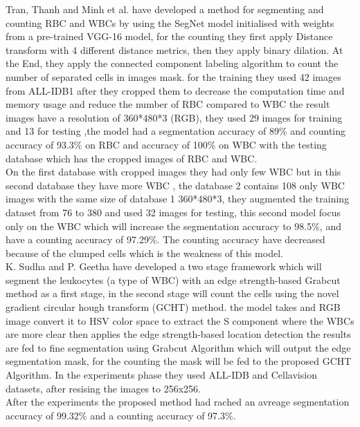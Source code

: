 Tran, Thanh and Minh et al. \textsuperscript{\cite{tran2019blood}} have developed a method for segmenting and counting RBC and WBCs by using the SegNet model initialised with weights from a pre-trained VGG-16 model, for the counting they first apply Distance transform with 4 different distance metrics, then they apply binary dilation. At the End, they apply the connected component labeling algorithm to count the number of separated cells in images mask. for the training they used 42 images from ALL-IDB1 \textsuperscript{\cite{labati2011all}} after they cropped them to decrease the computation time and
memory usage and reduce the number of RBC compared to WBC the result images have a resolution of 360*480*3 (RGB), they used 29 images for training and 13 for testing ,the model had a segmentation accuracy of 89\% and counting accuracy of 93.3\% on RBC and accuracy of 100\% on WBC with the testing database which has the cropped images of RBC and WBC.\\
On the first database with cropped images they had only few WBC but in this second database they have more WBC , the database 2 contains 108 only WBC images with the same size of database 1 360*480*3, they augmented the training dataset from 76 to 380 and used 32 images for testing, this second model focus only on the WBC which will increase the segmentation accuracy to 98.5\%, and have a counting accuracy of 97.29\%. The counting accuracy have decreased because of the clumped cells which is the weakness of this model.\\

K. Sudha and P. Geetha \textsuperscript{\cite{SUDHA2020639}} have developed a two stage framework which will segment the leukocytes (a type of WBC) with an edge strength-based Grabcut method as a first stage, in the second stage will count the cells using the novel gradient circular hough transform (GCHT) method. the model takes and RGB image convert it to HSV color space to extract the S component where the WBCs are more clear then applies the edge strength-based location detection the results are fed to fine segmentation using Grabcut Algorithm which will output the edge segmentation mask, for the counting the mask will be fed to the proposed GCHT Algorithm. In the experiments phase they used ALL-IDB \textsuperscript{\cite{labati2011all}} and Cellavision \textsuperscript{\cite{Zheng2018}} datasets, after resising the images to 256x256.\\
After the experiments the proposed method had rached an avreage segmentation accuracy of 99.32\% and a counting accuracy of 97.3\%.

